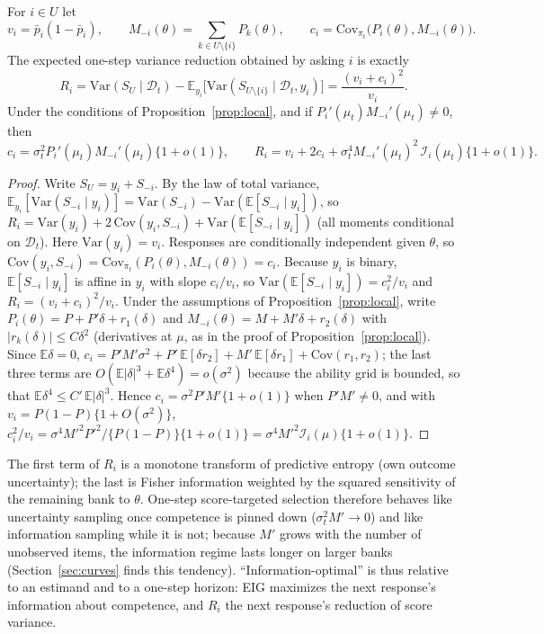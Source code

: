 \begin{proposition}\label{prop:evr}
For $i\in U$ let
\[
v_i=\bar p_i(1-\bar p_i),\qquad M_{-i}(\theta)=\sum_{k\in U\setminus\{i\}}P_k(\theta),\qquad
c_i=\mathrm{Cov}_{\pi_t}\big(P_i(\theta),M_{-i}(\theta)\big).
\]
The expected one-step variance reduction obtained by asking $i$ is exactly
\begin{equation}\label{eq:evr}
R_i=\mathrm{Var}(S_U\mid\mathcal D_t)-\mathbb E_{y_i}\big[\mathrm{Var}(S_{U\setminus\{i\}}\mid\mathcal D_t,y_i)\big]
=\frac{(v_i+c_i)^2}{v_i}.
\end{equation}
Under the conditions of Proposition~\ref{prop:local}, and if
$P_i'(\mu_t)M_{-i}'(\mu_t)\neq0$, then
\[
c_i=\sigma_t^2P_i'(\mu_t)M_{-i}'(\mu_t)\{1+o(1)\},\qquad
R_i=v_i+2c_i+\sigma_t^4M_{-i}'(\mu_t)^2\,\mathcal I_i(\mu_t)\{1+o(1)\}.
\]
\end{proposition}

\begin{proof}
Write $S_U=y_i+S_{-i}$. By the law of total variance,
$\mathbb E_{y_i}[\mathrm{Var}(S_{-i}\mid y_i)]=\mathrm{Var}(S_{-i})-\mathrm{Var}(\mathbb E[S_{-i}\mid y_i])$, so
$R_i=\mathrm{Var}(y_i)+2\,\mathrm{Cov}(y_i,S_{-i})+\mathrm{Var}(\mathbb E[S_{-i}\mid y_i])$ (all moments
conditional on $\mathcal D_t$). Here $\mathrm{Var}(y_i)=v_i$. Responses are conditionally
independent given $\theta$, so $\mathrm{Cov}(y_i,S_{-i})=\mathrm{Cov}_{\pi_t}(P_i(\theta),M_{-i}(\theta))=c_i$.
Because $y_i$ is binary, $\mathbb E[S_{-i}\mid y_i]$ is affine in $y_i$ with slope
$c_i/v_i$, so $\mathrm{Var}(\mathbb E[S_{-i}\mid y_i])=c_i^2/v_i$ and $R_i=(v_i+c_i)^2/v_i$.
Under the assumptions of Proposition~\ref{prop:local}, write
$P_i(\theta)=P+P'\delta+r_1(\delta)$ and $M_{-i}(\theta)=M+M'\delta+r_2(\delta)$ with
$|r_k(\delta)|\le C\delta^2$ (derivatives at $\mu$, as in the proof of Proposition~\ref{prop:local}). Since $\mathbb E\delta=0$,
$c_i=P'M'\sigma^2+P'\,\mathbb E[\delta r_2]+M'\,\mathbb E[\delta r_1]+\mathrm{Cov}(r_1,r_2)$; the
last three terms are $O(\mathbb E|\delta|^3+\mathbb E\delta^4)=o(\sigma^2)$ because the ability
grid is bounded, so that $\mathbb E\delta^4\le C'\,\mathbb E|\delta|^3$. Hence
$c_i=\sigma^2P'M'\{1+o(1)\}$ when $P'M'\neq0$, and with $v_i=P(1-P)\{1+O(\sigma^2)\}$,
$c_i^2/v_i=\sigma^4M'^2P'^2/\{P(1-P)\}\{1+o(1)\}=\sigma^4M'^2\mathcal I_i(\mu)\{1+o(1)\}$.
\end{proof}

The first term of $R_i$ is a monotone transform of predictive entropy (own outcome
uncertainty); the last is Fisher information weighted by the squared sensitivity of the
remaining bank to $\theta$. One-step score-targeted selection therefore behaves like
uncertainty sampling once competence is pinned down ($\sigma_t^2M'\to0$) and like
information sampling while it is not; because $M'$ grows with the number of unobserved
items, the information regime lasts longer on larger banks (Section~\ref{sec:curves}
finds this tendency). ``Information-optimal'' is thus relative to an estimand and to a
one-step horizon: EIG maximizes the next response's information about competence, and
$R_i$ the next response's reduction of score variance.
